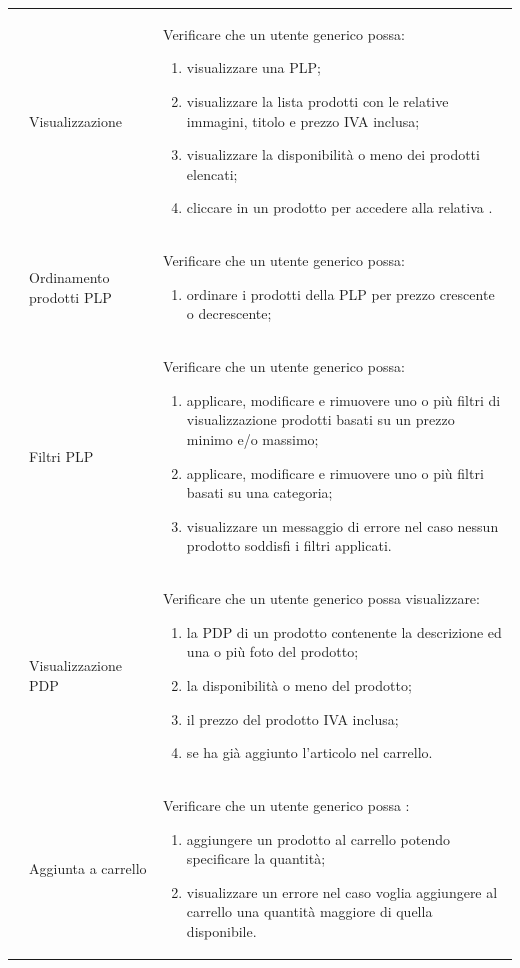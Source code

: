 \begin{center}
\begin{longtable}{|p{1cm}|p{4.85cm}|p{9cm}|}
		 & Visualizzazione \glock{PLP} & Verificare che un utente generico possa: 
		\begin{enumerate}
			\item  visualizzare una PLP;
			\item  visualizzare la lista prodotti con le relative immagini, titolo e prezzo IVA inclusa;
			\item  visualizzare la disponibilità o meno dei prodotti elencati;
			\item  cliccare in un prodotto per accedere alla relativa \glock{PDP}.
		\end{enumerate} \\

		 & Ordinamento prodotti PLP & Verificare che un utente generico possa: 
		\begin{enumerate}
			\item  ordinare i prodotti della PLP per prezzo crescente o decrescente;
		\end{enumerate} \\

		 & Filtri PLP & Verificare che un utente generico possa: 
		\begin{enumerate}
			\item  applicare, modificare e rimuovere uno o più filtri di visualizzazione prodotti basati su un prezzo minimo e/o massimo;
			\item  applicare, modificare e rimuovere uno o più filtri basati su una categoria;
			\item  visualizzare un messaggio di errore nel caso nessun prodotto soddisfi i filtri applicati.
		\end{enumerate} \\

		 & Visualizzazione PDP & Verificare che un utente generico possa visualizzare: 
		\begin{enumerate}
			\item   la PDP di un prodotto contenente la descrizione ed una o più foto del prodotto;
			\item   la disponibilità o meno del prodotto;
			\item   il prezzo del prodotto IVA inclusa;
			\item   se ha già aggiunto l'articolo nel carrello.
		\end{enumerate} \\

		 & Aggiunta a carrello & Verificare che un utente generico possa : 
		\begin{enumerate}
			\item   aggiungere un prodotto al carrello potendo specificare la quantità;
			\item   visualizzare un errore nel caso voglia aggiungere al carrello una quantità maggiore di quella disponibile.
		\end{enumerate} \\


\end{longtable}
\end{center}

